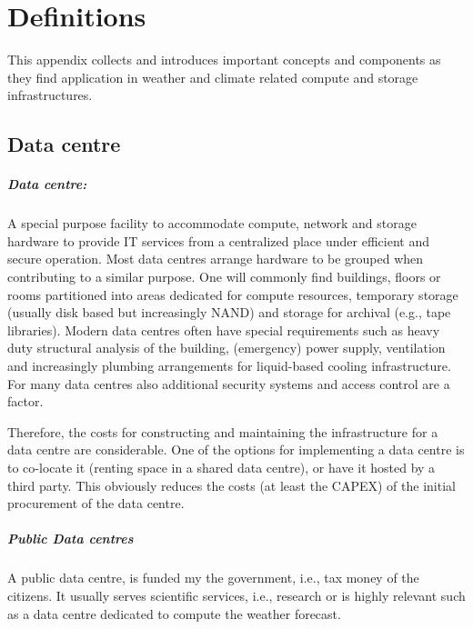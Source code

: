 \chapter{Definitions}
\label{sec:definitions}
\vspace{2em}

This appendix collects and introduces important concepts and components as they find application in weather and climate related compute and storage infrastructures.


\section{Data centre}

\paragraph{Data centre:}
A special purpose facility to accommodate compute, network and storage hardware to provide IT services from a centralized place under efficient and secure operation.
Most data centres arrange hardware to be grouped when contributing to a similar purpose.
One will commonly find buildings, floors or rooms partitioned into areas dedicated for compute resources, temporary storage (usually disk based but increasingly NAND) and storage for archival (e.g., tape libraries).
Modern data centres often have special requirements such as heavy duty structural analysis of the building, (emergency) power supply, ventilation and increasingly plumbing arrangements for liquid-based cooling infrastructure.
For many data centres also additional security systems and access control are a factor.

Therefore, the costs for constructing and maintaining the infrastructure for a data centre are considerable.
One of the options for implementing a data centre is to co-locate it (renting space in a shared data centre), or have it hosted by a third party.  This obviously reduces the costs (at least the CAPEX) of the initial procurement of the data centre.

\paragraph{Public Data centres}

A public data centre, is funded my the government, i.e., tax money of the citizens.
It usually serves scientific services, i.e., research or is highly relevant such as a data centre dedicated to compute the weather forecast.

